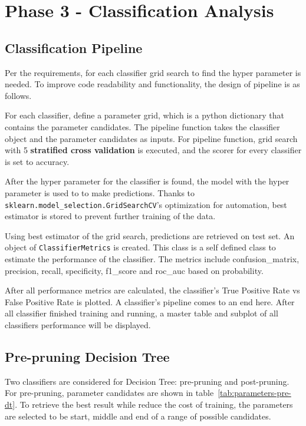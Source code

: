 \section{Phase 3 - Classification Analysis}

\subsection{Classification Pipeline}

Per the requirements, for each classifier grid search to find the hyper parameter is needed. To improve code readability and functionality, the design of pipeline is as follows.

For each classifier, define a parameter grid, which is a python dictionary that contains the parameter candidates. The pipeline function takes the classifier object and the parameter candidates as inputs. For pipeline function, grid search with 5 \textbf{stratified cross validation} is executed, and the scorer for every classifier is set to accuracy.

After the hyper parameter for the classifier is found, the model with the hyper parameter is used to to make predictions. Thanks to\\ \texttt{sklearn.model\_selection.GridSearchCV}'s optimization for automation, best estimator is stored to prevent further training of the data.

Using best estimator of the grid search, predictions are retrieved on test set. An object of \texttt{ClassifierMetrics} is created. This class is a self defined class to estimate the performance of the classifier. The metrics include confusion\_matrix, precision, recall, specificity, f1\_score and roc\_auc based on probability.

After all performance metrics are calculated, the classifier's True Positive Rate vs False Positive Rate is plotted. A classifier's pipeline comes to an end here. After all classifier finished training and running, a master table and subplot of all classifiers performance will be displayed. 

\subsection{Pre-pruning Decision Tree}

Two classifiers are considered for Decision Tree: pre-pruning and post-pruning. For pre-pruning, parameter candidates are shown in table~\ref{tab:parameters-pre-dt}. To retrieve the best result while reduce the cost of training, the parameters are selected to be start, middle and end of a range of possible candidates. 

